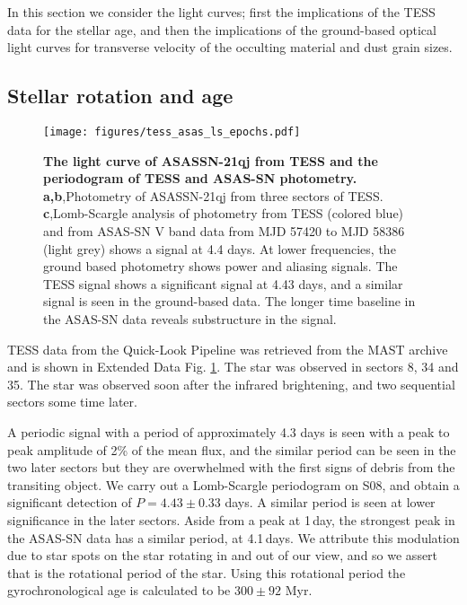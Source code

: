 \documentclass[sn-nature,oneside]{sn-jnl}%
\begin{document}
In this section we consider the light curves; first the implications of the TESS data for the stellar age, and then the implications of the ground-based optical light curves for transverse velocity of the occulting material and dust grain sizes.

\subsection*{Stellar rotation and age}

\begin{figure}
\centering
\texttt{[image: figures/tess\_asas\_ls\_epochs.pdf]}
      \caption{\textbf{The light curve of ASASSN-21qj from TESS and the periodogram of TESS and ASAS-SN photometry.}
      {\bf a,b},Photometry of ASASSN-21qj from three sectors of TESS.
      {\bf c},Lomb-Scargle analysis of photometry from TESS (colored blue) and from ASAS-SN V band data from MJD 57420 to MJD 58386 (light grey) shows a signal at 4.4 days.
      At lower frequencies, the ground based photometry shows power and aliasing signals.
      The TESS signal shows a significant signal at 4.43 days, and a similar signal is seen in the ground-based data.
      The longer time baseline in the ASAS-SN data reveals substructure in the signal.}
                \label{fig:TESS_lc}

\end{figure}

TESS data from the Quick-Look Pipeline \cite{2020RNAAS...4..204H,2021RNAAS...5..234K} was retrieved from the MAST archive and is shown in Extended Data Fig. \ref{fig:TESS_lc}.
%
The star was observed in sectors 8, 34 and 35.
%
The star was observed soon after the infrared brightening, and two sequential sectors some time later.

A periodic signal with a period of approximately 4.3 days is seen with a peak to peak amplitude of 2\% of the mean flux, and the similar period can be seen in the two later sectors but they are overwhelmed with the first signs of debris from the transiting object.
%
We carry out a Lomb-Scargle periodogram on S08, and obtain a significant detection of $P=4.43\pm 0.33$ days.
%
A similar period is seen at lower significance in the later sectors.
%
Aside from a peak at 1\,day, the  strongest peak in the ASAS-SN data has a similar period, at 4.1\,days.
%
We attribute this modulation due to star spots on the star rotating in and out of our view, and so we assert that is the rotational period of the star.
%
Using this rotational period the gyrochronological age \cite{Bouma23,Kounkel22} is calculated to be $300\pm92$ Myr.
\end{document}
